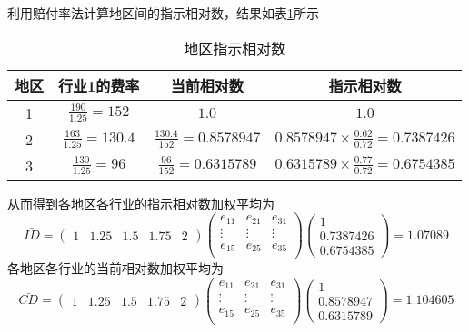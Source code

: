 \documentclass[a4paper,12pt]{ctexart}
\begin{document}
利用赔付率法计算地区间的指示相对数，结果如表\ref{tab:2}所示
\begin{table}[H]
    \centering
    \begin{tabular}{|c|c|c|c|}
        \hline
        地区 & 行业1的费率                   & 当前相对数                         & 指示相对数                                         \\\hline
        1  & $\frac{190}{1.25}=152$   & $1.0$                         & $1.0$                                         \\
        2  & $\frac{163}{1.25}=130.4$ & $\frac{130.4}{152}=0.8578947$ & $0.8578947\times\frac{0.62}{0.72}=0.7387426$  \\
        3  & $\frac{130}{1.25}=96$    & $\frac{96}{152}=0.6315789$    & $0.6315789\times \frac{0.77}{0.72}=0.6754385$ \\\hline
    \end{tabular}
    \caption{地区指示相对数}\label{tab:2}
\end{table}

从而得到各地区各行业的指示相对数加权平均为
\begin{equation}\label{eq:id_2}
    \bar{ID}=
    \begin{pmatrix}
        1 & 1.25 & 1.5 & 1.75 & 2
    \end{pmatrix}
    \begin{pmatrix}
        e_{11} & e_{21} & e_{31} \\
        \vdots & \vdots & \vdots \\
        e_{15} & e_{25} & e_{35} \\
    \end{pmatrix}
    \begin{pmatrix}
        1 \\0.7387426\\0.6754385
    \end{pmatrix}
    =1.07089
\end{equation}
各地区各行业的当前相对数加权平均为
\begin{equation}\label{eq:cd}
    \bar{CD}=
    \begin{pmatrix}
        1 & 1.25 & 1.5 & 1.75 & 2
    \end{pmatrix}
    \begin{pmatrix}
        e_{11} & e_{21} & e_{31} \\
        \vdots & \vdots & \vdots \\
        e_{15} & e_{25} & e_{35} \\
    \end{pmatrix}
    \begin{pmatrix}
        1 \\0.8578947\\0.6315789
    \end{pmatrix}
    =1.104605
\end{equation}
\end{document}
